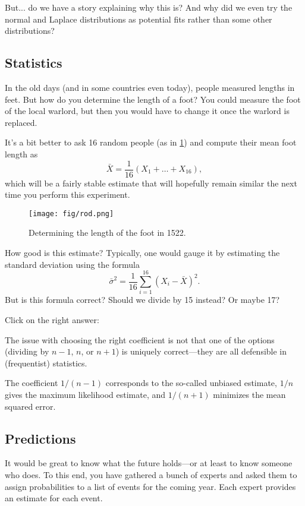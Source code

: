 \documentclass{article}
\begin{document}
But... do we have a story explaining why this is? And why did we even try the normal and Laplace distributions as potential fits rather than some other distributions?

\subsection{Statistics}

In the old days (and in some countries even today), people measured lengths in feet. But how do you determine the length of a foot? You could measure the foot of the local warlord, but then you would have to change it once the warlord is replaced.

It's a bit better to ask 16 random people (as in \cref{fig:rod}) and compute their mean foot length as
\[
\bar X = \frac{1}{16} (X_1 + \dots + X_{16}),
\]
which will be a fairly stable estimate that will hopefully remain similar the next time you perform this experiment.

\begin{figure}
    \centering
    \texttt{[image: fig/rod.png]}
    \caption{Determining the length of the foot in 1522.}
    \label{fig:rod}
\end{figure}

How good is this estimate? Typically, one would gauge it by estimating the standard deviation using the formula
\[
\bar \sigma^2 = \frac{1}{16} \sum_{i=1}^{16} (X_i - \bar X)^2.
\]
But is this formula correct? Should we divide by 15 instead? Or maybe 17?

Click on the right answer: 

The issue with choosing the right coefficient is not that one of the options (dividing by \(n-1\), \(n\), or \(n+1\)) is uniquely correct—they are all defensible in (frequentist) statistics.

The coefficient \(1/(n-1)\) corresponds to the so-called unbiased estimate, \(1/n\) gives the maximum likelihood estimate, and \(1/(n+1)\) minimizes the mean squared error.

\subsection{Predictions}

It would be great to know what the future holds—or at least to know someone who does. To this end, you have gathered a bunch of experts and asked them to assign probabilities to a list of events for the coming year. Each expert provides an estimate for each event.
\end{document}
